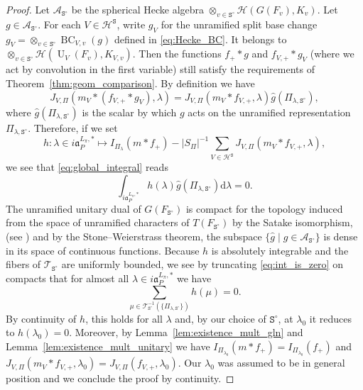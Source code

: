 \documentclass[letterpaper,11pt]{amsart}
\newcommand{\fa}{\mathfrak{a}}
\newcommand{\cA}{\mathcal{A}}
\newcommand{\cH}{\mathcal{H}}
\newcommand{\cT}{\mathcal{T}}
\newcommand{\rd}{\mathrm{d}}
\newcommand{\tS}{\mathtt{S}}
\newcommand{\<}{\negthickspace}
\DeclareMathOperator{\U}{U}
\DeclareMathOperator{\BC}{BC}
\theoremstyle{definition}
\theoremstyle{plain}
\theoremstyle{remark}
\numberwithin{equation}{section}
\begin{document}
\begin{proof}
Let $\cA_{\tS^\circ}$ be the spherical Hecke algebra $\otimes_{v \in \tS^\circ} \cH(G(F_v),K_v)$. Let $g \in \cA_{\tS^\circ}$. For each $V \in \cH^\tS$, write $g_V$ for the unramified split base change $g_V=\otimes_{v \in \tS^\circ} \BC_{V,v}(g)$ defined in \eqref{eq:Hecke_BC}. It belongs to $\otimes_{v \in \tS^\circ} \cH(\U_V(F_v),K_{V,v})$. Then the functions $f_+*g$ and $f_{V,+}*g_V$ (where we act by convolution in the first variable) still satisfy the requirements of Theorem~\ref{thm:geom_comparison}. By definition we have
\begin{equation*}
    J_{V,\Pi}(m_V * (f_{V,+}*g_V),\lambda)=J_{V,\Pi}(m_V * f_{V,+},\lambda)\widehat{g}(\Pi_{\lambda,\tS^\circ}),
\end{equation*}
where $\widehat{g}(\Pi_{\lambda,\tS^\circ})$ is the scalar by which $g$ acts on the unramified representation $\Pi_{\lambda,\tS^\circ}$. Therefore, if we set
\begin{equation*}
    h : \lambda \in i \fa_{P}^{L_\pi,*} \mapsto I_{\Pi_\lambda}(m*f_+)- |S_\Pi|^{-1} \sum_{V \in \cH^\tS} J_{V,\Pi}(m_V * f_{V,+},\lambda),
\end{equation*}
we see that \eqref{eq:global_integral} reads
\begin{equation}
    \label{eq:int_is_zero}
    \int_{i \fa_{P}^{L_\pi,*}} h(\lambda)\widehat{g}(\Pi_{\lambda,\tS^\circ}) \rd\lambda=0.
\end{equation}
The unramified unitary dual of $G(F_{\tS^\circ})$ is compact for the topology induced from the space of unramified characters of $T(F_{\tS^\circ})$ by the Satake isomorphism, (see \cite{Ta88}) and by the Stone--Weierstrass theorem, the subspace $\{ \widehat{g} \; | \; g \in \cA_{\tS^\circ} \}$ is dense in its space of continuous functions. Because $h$ is absolutely integrable and the fibers of $\cT_{\tS^\circ}$ are uniformly bounded, we see by truncating \eqref{eq:int_is_zero} on compacts that for almost all $\lambda \in i \fa_{P}^{L_\pi,*}$ we have
\begin{equation*}
    \sum_{\mu \in \cT_{\tS^\circ}^{-1}(\{\Pi_{\lambda,\tS^\circ}\})} h(\mu)=0.
\end{equation*}
By continuity of $h$, this holds for all $\lambda$ and, by our choice of $\tS^\circ$, at $\lambda_0$ it reduces to $h(\lambda_0)=0$. Moreover, by Lemma~\ref{lem:existence_mult_gln} and Lemma~\ref{lem:existence_mult_unitary} we have $I_{\Pi_{\lambda_0}}(m*f_+)=I_{\Pi_{\lambda_0}}(f_+)$ and $J_{V,\Pi}(m_V * f_{V,+},\lambda_0)=J_{V,\Pi}(f_{V,+},\lambda_0)$. Our $\lambda_0$ was assumed to be in general position and we conclude the proof by continuity.
\end{proof}
\end{document}
